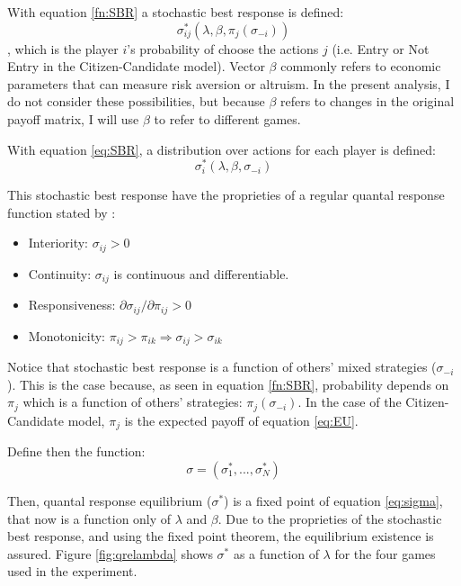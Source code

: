 
With equation \ref{fn:SBR} a stochastic best response is defined: 
\begin{equation}
\sigma^*_{ij}(\lambda, \beta, \pi_{j}(\sigma_{-i}))
\end{equation}\label{eq:SBR}
, which is the player $i$'s probability of choose the actions $j$ (i.e. Entry or Not Entry in the Citizen-Candidate model). 
Vector $\beta$ commonly refers to economic parameters that can measure risk aversion or altruism. In the present analysis, I do not consider these possibilities, but because $\beta$ refers to changes in the original payoff matrix, I will use $\beta$ to refer to different games.

With equation \ref{eq:SBR}, a distribution over actions for each player is defined: $$\sigma^*_{i}(\lambda, \beta, \sigma_{-i})$$ 

This stochastic best response have the proprieties of a regular quantal response function stated by :

\begin{itemize}
	\item Interiority: $\sigma_{ij} >0$
	\item Continuity: $\sigma_{ij}$ is continuous and differentiable. 
	\item Responsiveness:  $\partial \sigma_{ij} / \partial \pi_{ij} >0 $
	\item Monotonicity: $\pi_{ij}> \pi_{ik} \Rightarrow \sigma_{ij}>\sigma_{ik}$
\end{itemize}

Notice that stochastic best response is a function of others' mixed strategies ($\sigma_{-i}$). This is the case because, as seen in equation \ref{fn:SBR}, probability depends on $\pi_{j}$ which is a function of others' strategies: $\pi_{j}(\sigma_{-i})$. In the case of the Citizen-Candidate model, $\pi_j$ is the expected payoff of equation \ref{eq:EU}.

Define then the function:
\begin{equation}\label{eq:sigma}
\sigma = (\sigma^*_{1}, ..., \sigma^*_{N})
\end{equation}

Then, quantal response equilibrium ($\sigma^*$) is a fixed point of equation \ref{eq:sigma}, that now is a function only of $\lambda$ and $\beta$. 
Due to the proprieties of the stochastic best response, and using the fixed point theorem, the equilibrium existence is assured. Figure \ref{fig:qrelambda} shows $\sigma^*$ as a function of $\lambda$ for the four games used in the experiment.

